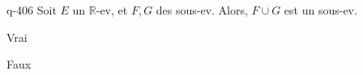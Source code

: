 \begin{truefalse}{q-406}
Soit $E$ un $\mathbb R$-ev, et $F,G$ des sous-ev. Alors, $F \cup G$ est un sous-ev.
\item Vrai
\item* Faux
\end{truefalse}

